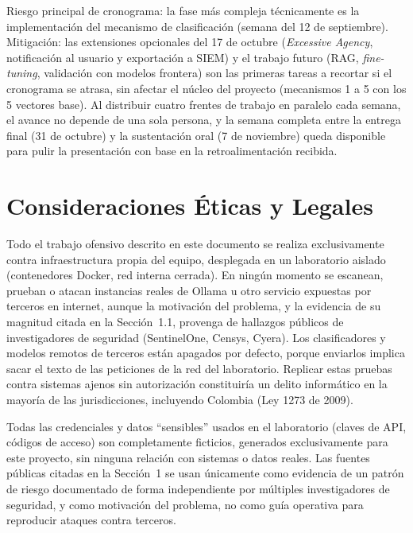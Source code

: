 \documentclass[11pt,letterpaper]{article}
\begin{document}
Riesgo principal de cronograma: la fase más compleja técnicamente es la implementación del mecanismo de clasificación (semana del 12 de septiembre). Mitigación: las extensiones opcionales del 17 de octubre (\emph{Excessive Agency}, notificación al usuario y exportación a SIEM) y el trabajo futuro (RAG, \emph{fine-tuning}, validación con modelos frontera) son las primeras tareas a recortar si el cronograma se atrasa, sin afectar el núcleo del proyecto (mecanismos 1 a 5 con los 5 vectores base). Al distribuir cuatro frentes de trabajo en paralelo cada semana, el avance no depende de una sola persona, y la semana completa entre la entrega final (31 de octubre) y la sustentación oral (7 de noviembre) queda disponible para pulir la presentación con base en la retroalimentación recibida.

\section{Consideraciones Éticas y Legales}
\label{sec:etica}

Todo el trabajo ofensivo descrito en este documento se realiza exclusivamente contra infraestructura propia del equipo, desplegada en un laboratorio aislado (contenedores Docker, red interna cerrada). En ningún momento se escanean, prueban o atacan instancias reales de Ollama u otro servicio expuestas por terceros en internet, aunque la motivación del problema, y la evidencia de su magnitud citada en la Sección~1.1, provenga de hallazgos públicos de investigadores de seguridad (SentinelOne, Censys, Cyera). Los clasificadores y modelos remotos de terceros están apagados por defecto, porque enviarlos implica sacar el texto de las peticiones de la red del laboratorio. Replicar estas pruebas contra sistemas ajenos sin autorización constituiría un delito informático en la mayoría de las jurisdicciones, incluyendo Colombia (Ley 1273 de 2009).

Todas las credenciales y datos ``sensibles'' usados en el laboratorio (claves de API, códigos de acceso) son completamente ficticios, generados exclusivamente para este proyecto, sin ninguna relación con sistemas o datos reales. Las fuentes públicas citadas en la Sección~1 se usan únicamente como evidencia de un patrón de riesgo documentado de forma independiente por múltiples investigadores de seguridad, y como motivación del problema, no como guía operativa para reproducir ataques contra terceros.
\end{document}

